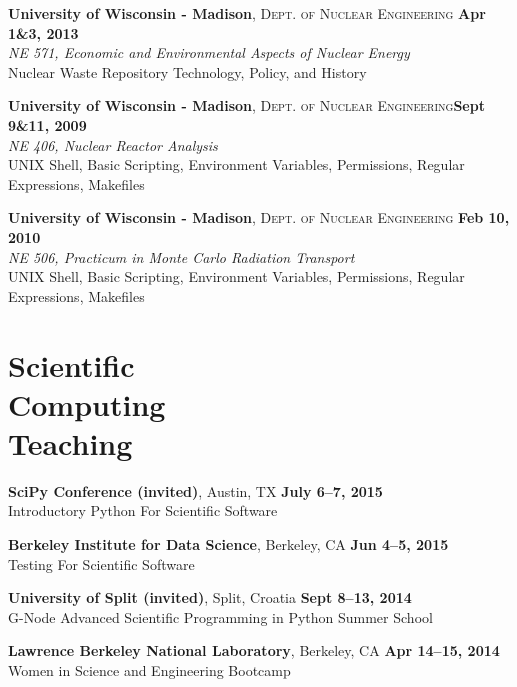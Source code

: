 \documentclass[margin,line]{resume}
\begin{document}
\begin{resume}
    \textbf{University of Wisconsin - Madison}, \textsc{Dept. of Nuclear Engineering} \hfill \textbf{Apr 1\&3, 2013}\\
               \textsl{NE 571, Economic and Environmental Aspects of Nuclear Energy}\\
               Nuclear Waste Repository Technology, Policy, and History

    \textbf{University of Wisconsin - Madison}, \textsc{Dept. of Nuclear Engineering}\hfill \textbf{Sept 9\&11, 2009}\\
               \textsl{NE 406, Nuclear Reactor Analysis}\\
               UNIX Shell, Basic Scripting, Environment Variables, Permissions, Regular Expressions, Makefiles

    \textbf{University of Wisconsin - Madison}, \textsc{Dept. of Nuclear
    Engineering} \hfill \textbf{Feb 10, 2010}\\
               \textsl{NE 506, Practicum in Monte Carlo Radiation Transport}\\
               UNIX Shell, Basic Scripting, Environment Variables, Permissions, Regular Expressions, Makefiles

    \section{\mysidestyle Scientific\\Computing\\Teaching}
    \textbf{SciPy Conference (invited)}, Austin, TX \hfill \textbf{July 6--7, 2015}\\
    Introductory Python For Scientific Software

    \textbf{Berkeley Institute for Data Science}, Berkeley, CA \hfill \textbf{Jun 4--5, 2015}\\
    Testing For Scientific Software

    \textbf{University of Split (invited)}, Split, Croatia \hfill \textbf{Sept 8--13, 2014}\\
    G-Node Advanced Scientific Programming in Python Summer School

    \textbf{Lawrence Berkeley National Laboratory}, Berkeley, CA \hfill \textbf{Apr 14--15, 2014}\\
    Women in Science and Engineering Bootcamp


\end{resume}
\end{document}
